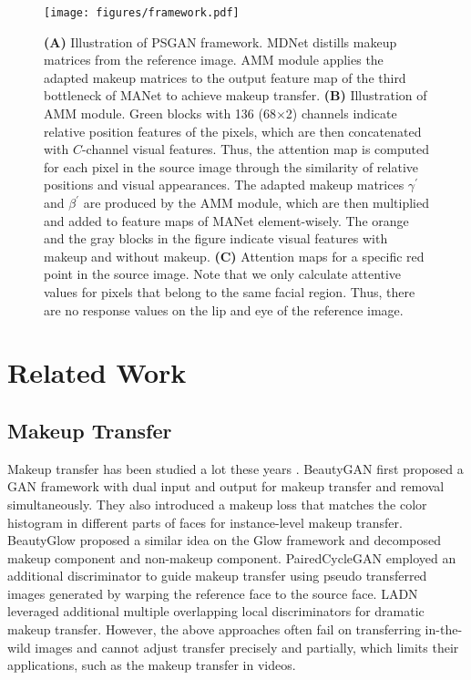 \begin{figure*}[!t]
    \centering
    \texttt{[image: figures/framework.pdf]}
    \caption{
        \textbf{(A)} Illustration of PSGAN framework. MDNet distills makeup matrices from the reference image. AMM module applies the adapted makeup matrices to the output feature map of the third bottleneck of MANet to achieve makeup transfer. 
        \textbf{(B)} Illustration of AMM module. Green blocks with 136 (68$\times$2) channels indicate relative position features of the pixels, which are then concatenated with $C$-channel visual features. Thus, the attention map is computed for each pixel in the source image through the similarity of relative positions and visual appearances. The adapted makeup matrices $\gamma^{\prime}$ and $\beta^{\prime}$ are produced by the AMM module, which are then multiplied and added to feature maps of MANet element-wisely. The orange and the gray blocks in the figure indicate visual features with makeup and without makeup. \textbf{(C)} Attention maps for a specific red point in the source image. Note that we only calculate attentive values for pixels that belong to the same facial region. Thus, there are no response values on the lip and eye of the reference image.
    }
    \vspace{-3mm}
    \label{framework}
\end{figure*} 

\section{Related Work}
\subsection{Makeup Transfer}
Makeup transfer has been studied a lot these years \cite{Tong2007ExampleBasedCT,Guo2009DigitalFM,Li2015SimulatingMT,Liu2016MakeupLA,Liu2014WowYA,Alashkar2017ExamplesRulesGD}.
BeautyGAN \cite{Li2018BeautyGANIF} first proposed a GAN framework with dual input and output for makeup transfer and removal simultaneously. They also introduced a makeup loss that matches the color histogram in different parts of faces for instance-level makeup transfer. BeautyGlow \cite{ChenBeautyGlow2019} proposed a similar idea on the Glow framework and decomposed makeup component and non-makeup component. PairedCycleGAN \cite{Chang2018PairedCycleGANAS} employed an additional discriminator to guide makeup transfer using pseudo transferred images generated by warping the reference face to the source face. LADN \cite{Gu2019LADNLA} leveraged additional multiple overlapping local discriminators for dramatic makeup transfer.
However, the above approaches often fail on transferring in-the-wild images and cannot adjust transfer precisely and partially, which limits their applications, such as the makeup transfer in videos.

